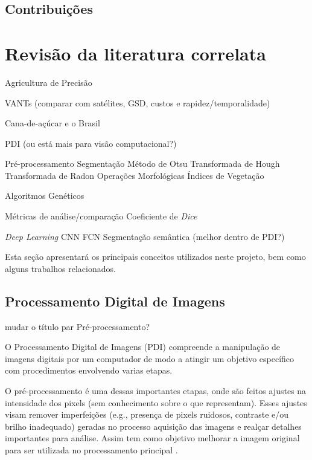 \documentclass[12pt, a4paper, english, brazil]{article}
\newcommand{\textRed}[1]{{{\color{red} #1}}}
\newcommand{\textBlue}[1]{{{\color{blue} #1}}}
\begin{document}
\subsection{Contribuições}

\section{Revisão da literatura correlata}

\textBlue{
Agricultura de Precisão

VANTs (comparar com satélites, GSD, custos e rapidez/temporalidade)

Cana-de-açúcar e o Brasil

PDI (ou está mais para visão computacional?)

    Pré-processamento
    Segmentação
    Método de Otsu
    Transformada de Hough
    Transformada de Radon
    Operações Morfológicas
    Índices de Vegetação

Algoritmos Genéticos

Métricas de análise/comparação
    Coeficiente de \textit{Dice}

\textit{Deep Learning}
    CNN
    FCN
    Segmentação semântica (melhor dentro de PDI?)
}

Esta seção apresentará os principais conceitos utilizados neste projeto, bem como alguns trabalhos relacionados.


\subsection{Processamento Digital de Imagens}

\textRed{mudar o título par Pré-processamento?}

O Processamento Digital de Imagens (PDI) compreende a manipulação de imagens digitais por um computador de modo a atingir um objetivo específico com procedimentos envolvendo varias etapas. 

O pré-processamento é uma dessas importantes etapas, onde são feitos ajustes na intensidade dos pixels (sem conhecimento sobre o que representam). Esses ajustes visam remover imperfeições (e.g., presença de pixels ruidosos, contraste e/ou brilho inadequado) geradas no processo aquisição das imagens e realçar detalhes importantes para análise. Assim tem como objetivo melhorar a imagem original para ser utilizada no processamento principal \cite{Marques_Filho_1999}.
\end{document}
